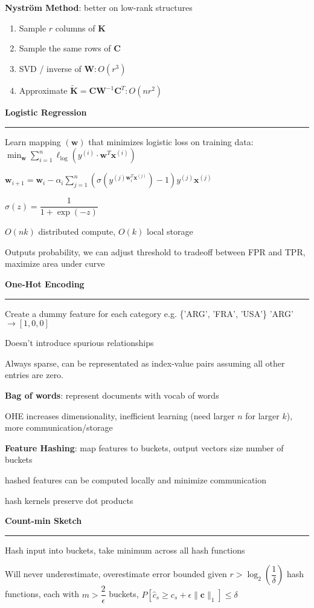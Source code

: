 \documentclass[8pt,letter,landscape]{article}
\newcommand{\sectiontitle}[1]{\textbf{\large #1}\vspace{0.2em}\hrule\vspace{0.5em}}
\begin{document}
\begin{multicols*}{3}
\textbf{Nyström Method}: better on low-rank structures
\begin{enumerate}[leftmargin=*,nosep]
    \item Sample $r$ columns of $\mathbf{K}$
    \item Sample the same rows of $\mathbf{C}$
    \item SVD / inverse of $\mathbf{W} : O(r^3)$
    \item Approximate $\tilde{\mathbf{K}} = \mathbf{C}\mathbf{W}^{-1}\mathbf{C}^T : O(nr^2)$
\end{enumerate}

\sectiontitle{Logistic Regression}
Learn mapping $(\mathbf{w})$ that minimizes logistic loss on training data: $\min_{\mathbf{w}} \sum_{i = 1}^{n} \ell_{\log} \left(y^{(i)} \cdot \mathbf{w}^T \mathbf{x}^{(i)}\right)$

$\mathbf{w}_{i + 1} = \mathbf{w}_i - \alpha_i \sum_{j = 1}^n (\sigma(y^{(j)\mathbf{w}_i^T \mathbf{x}^{(j)}}) - 1) y^{(j)} \mathbf{x}^{(j)}$

$\sigma(z) = \dfrac{1}{1 + \exp(-z)}$

$O(nk)$ distributed compute, $O(k)$ local storage

Outputs probability, we can adjust threshold to tradeoff between FPR and TPR, maximize area under curve

\sectiontitle{One-Hot Encoding}
Create a dummy feature for each category e.g. \{'ARG', 'FRA', 'USA'\} 'ARG' $\rightarrow [1, 0, 0]$

Doesn't introduce spurious relationships

Always sparse, can be representated as index-value pairs assuming all other entries are zero.

\textbf{Bag of words}: represent documents with vocab of words

OHE increases dimensionality, inefficient learning (need larger $n$ for larger $k$), more communication/storage

\textbf{Feature Hashing}: map features to buckets, output vectors size number of buckets

hashed features can be computed locally and minimize communication

hash kernels preserve dot products

\sectiontitle{Count-min Sketch}

Hash input into buckets, take minimum across all hash functions

Will never underestimate, overestimate error bounded given $r > \log_2 (\dfrac{1}{\delta})$ hash functions, each with $m > \dfrac{2}{\epsilon}$ buckets, $P[\hat{c}_s \geq c_s + \epsilon \|\mathbf{c}\|_1] \leq \delta$


\end{multicols*}
\end{document}
